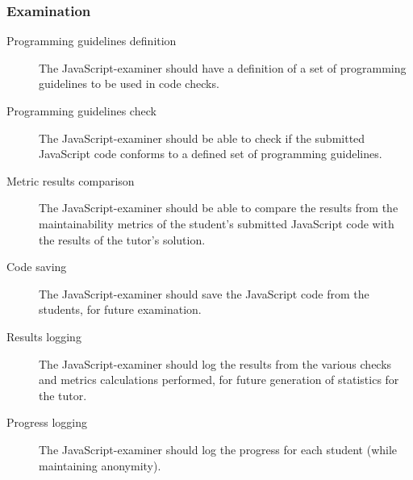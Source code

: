 \subsubsection{Examination}
\begin{description}
  \item[Programming guidelines definition] The JavaScript-examiner should have
    a definition of a set of programming guidelines to be used in code checks.
  \item[Programming guidelines check] The JavaScript-examiner should be able to
    check if the submitted JavaScript code conforms to a defined set of
    programming guidelines.
  \item[Metric results comparison] The JavaScript-examiner should be able to
    compare the results from the maintainability metrics of the student's
    submitted JavaScript code with the results of the tutor's solution.
  \item[Code saving] The JavaScript-examiner should save the JavaScript code
    from the students, for future examination.
  \item[Results logging] The JavaScript-examiner should log the results from
    the various checks and metrics calculations performed, for future
    generation of statistics for the tutor.
  \item[Progress logging] The JavaScript-examiner should log the progress for each
    student (while maintaining anonymity).
\end{description}
